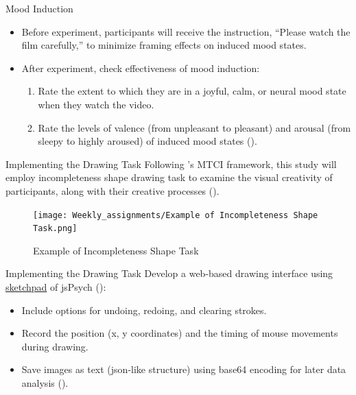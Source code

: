 \documentclass[pdf]{beamer}
\begin{document}
\begin{frame}{Mood Induction}
\begin{itemize}
    \item<1-> Before experiment, participants will receive the instruction, “Please watch the film carefully,” to minimize framing effects on induced mood states.
    \item <2-> After experiment, check effectiveness of mood induction:
        \begin{enumerate}
            \item Rate the extent to which they are in a joyful, calm, or neural mood state when they watch the video.
            \item Rate the levels of valence (from unpleasant to pleasant) and arousal (from sleepy to highly aroused) of induced mood states (\cite{kucera_using_2012}).
        \end{enumerate}
\end{itemize}
\end{frame}


\begin{frame}{Implementing the Drawing Task}
Following \textcite{barbot_dynamics_2018}'s MTCI framework, this study will employ
\alert{incompleteness shape drawing task} to examine the visual creativity of participants, along with their creative processes (\cite{patterson_audra_2023}).

\begin{figure}
    \centering
    \texttt{[image: Weekly\_assignments/Example of Incompleteness Shape Task.png]}
    \caption{Example of Incompleteness Shape Task}
\end{figure}
\end{frame}

\begin{frame}{Implementing the Drawing Task}
Develop a web-based drawing interface using \href{https://www.jspsych.org/7.1/plugins/sketchpad/}{sketchpad} of jsPsych (\cite{leeuw_jspsych_2023}):
\begin{itemize}
    \item<1-> Include options for undoing, redoing, and clearing strokes.
    \item<2-> Record the position (x, y coordinates) and the timing of mouse movements during drawing.
    \item<3-> Save images as text (json-like structure) using base64 encoding for later data analysis (\cite{bainbridge_tutorial_2022}).
\end{itemize}

\end{frame}
\end{document}
